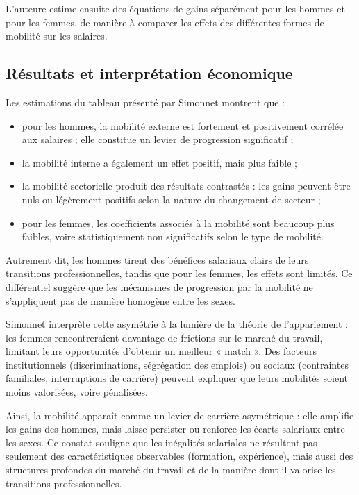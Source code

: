\documentclass[12pt,a4paper]{article}
\begin{document}
L’auteure estime ensuite des équations de gains séparément pour les hommes et pour les femmes, de manière à comparer les effets des différentes formes de mobilité sur les salaires.

\subsection{Résultats et interprétation économique}

Les estimations du tableau présenté par Simonnet montrent que :
\begin{itemize}
    \item pour les hommes, la mobilité externe est fortement et positivement corrélée aux salaires ; elle constitue un levier de progression significatif ;
    \item la mobilité interne a également un effet positif, mais plus faible ;
    \item la mobilité sectorielle produit des résultats contrastés : les gains peuvent être nuls ou légèrement positifs selon la nature du changement de secteur ;
    \item pour les femmes, les coefficients associés à la mobilité sont beaucoup plus faibles, voire statistiquement non significatifs selon le type de mobilité.
\end{itemize}

Autrement dit, les hommes tirent des bénéfices salariaux clairs de leurs transitions professionnelles, tandis que pour les femmes, les effets sont limités.  
Ce différentiel suggère que les mécanismes de progression par la mobilité ne s’appliquent pas de manière homogène entre les sexes.

Simonnet interprète cette asymétrie à la lumière de la théorie de l’appariement :  
les femmes rencontreraient davantage de frictions sur le marché du travail, limitant leurs opportunités d’obtenir un meilleur « match ».  
Des facteurs institutionnels (discriminations, ségrégation des emplois) ou sociaux (contraintes familiales, interruptions de carrière) peuvent expliquer que leurs mobilités soient moins valorisées, voire pénalisées.

Ainsi, la mobilité apparaît comme un levier de carrière asymétrique : elle amplifie les gains des hommes, mais laisse persister ou renforce les écarts salariaux entre les sexes.  
Ce constat souligne que les inégalités salariales ne résultent pas seulement des caractéristiques observables (formation, expérience), mais aussi des structures profondes du marché du travail et de la manière dont il valorise les transitions professionnelles.
\end{document}
